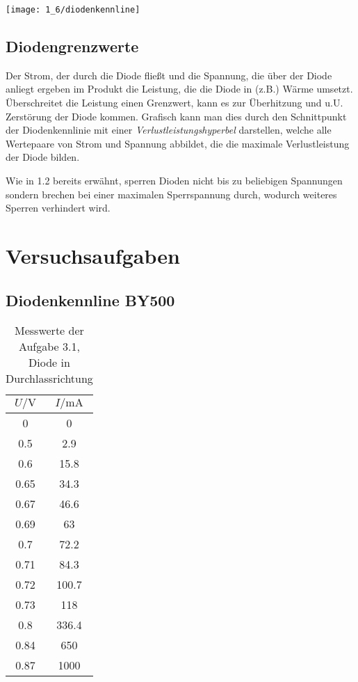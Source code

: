 \documentclass[a4paper, 12pt]{article}
\begin{document}
\begin{center}
  \texttt{[image: 1\_6/diodenkennline]}
\end{center}


\subsection{Diodengrenzwerte}

Der Strom, der durch die Diode fließt und die Spannung, die über der Diode
anliegt ergeben im Produkt die Leistung, die die Diode in (z.B.) Wärme umsetzt.
Überschreitet die Leistung einen Grenzwert, kann es zur Überhitzung und u.U.
Zerstörung der Diode kommen. Grafisch kann man dies durch den Schnittpunkt der
Diodenkennlinie mit einer
\emph{Verlustleistungshyperbel} darstellen, welche alle Wertepaare von Strom und
Spannung abbildet, die die maximale Verlustleistung der Diode bilden.

Wie in 1.2 bereits erwähnt, sperren Dioden nicht bis zu beliebigen Spannungen
sondern brechen bei einer maximalen Sperrspannung durch, wodurch weiteres
Sperren verhindert wird.


\pagebreak

  \clearpage
\setcounter{page}{1}

\setcounter{section}{0}
\section{Versuchsaufgaben}


\subsection{Diodenkennline BY500}
\begin{table}[H]
\begin{center}
\begin{tabular}{@{}c|c@{}}
\toprule
$U / \si{\volt}$    & $I / \si{\milli\ampere}$     \\ \midrule
0    & 0     \\
0.5  & 2.9   \\
0.6  & 15.8  \\
0.65 & 34.3  \\
0.67 & 46.6  \\
0.69 & 63    \\
0.7  & 72.2  \\
0.71 & 84.3  \\
0.72 & 100.7 \\
0.73 & 118   \\
0.8  & 336.4 \\
0.84 & 650   \\
0.87 & 1000  \\ \bottomrule
\end{tabular}
\end{center}
\caption{Messwerte der Aufgabe 3.1, Diode in Durchlassrichtung}
\end{table}
\end{document}
